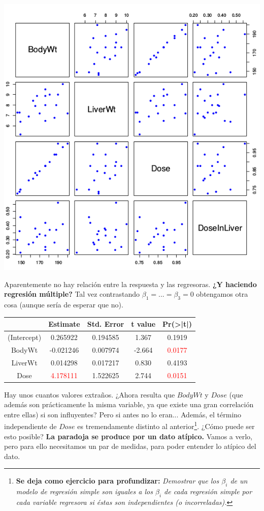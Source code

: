 \begin{center}
\includegraphics[scale=0.6]{img/DiagramaRatas.png}
\end{center}

Aparentemente no hay relación entre la respuesta y las regresoras. \textbf{¿Y haciendo regresión múltiple?} Tal vez contrastando $β_1 = ... = β_3 = 0$ obtengamos otra cosa (aunque sería de esperar que no).

\begin{tabular}{ccccc}
&Estimate&Std. Error&t value&Pr(>|t|)\\\hline
(Intercept)&0.265922&0.194585&1.367&0.1919\\
BodyWt&-0.021246&0.007974&-2.664&\textcolor{red}{0.0177}\\
LiverWt&0.014298&0.017217&0.830&0.4193\\
Dose&\textcolor{red}{4.178111}&1.522625&2.744&\textcolor{red}{0.0151}
\end{tabular}

Hay unos cuantos valores extraños. ¿Ahora resulta que $BodyWt$ y $Dose$ (que además son prácticamente la misma variable, ya que existe una gran correlación entre ellas) si son influyentes? Pero si antes no lo eran... Además, el término independiente de $Dose$ es tremendamente distinto al anterior\footnote{\textbf{Se deja como ejercicio para profundizar: }\textit{Demostrar que los $β_i$ de un modelo de regresión simple son iguales a los $β_i$ de cada regresión simple por cada variable regresora si éstas son independientes (o incorreladas).}}. ¿Cómo puede ser esto posible? \textbf{La paradoja se produce por un dato atípico.} Vamos a verlo, pero para ello necesitamos un par de medidas, para poder entender lo atípico del dato.




